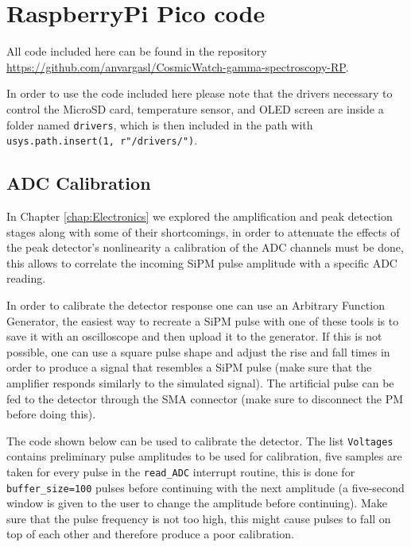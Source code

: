 \chapter{RaspberryPi Pico code}\label{app:RP_Pico_code}

All code included here can be found in the repository \\ \href{https://github.com/anvargasl/CosmicWatch-gamma-spectroscopy-RP}{https://github.com/anvargasl/CosmicWatch-gamma-spectroscopy-RP}.

In order to use the code included here please note that the drivers necessary to control the MicroSD card, temperature sensor, and OLED screen are inside a folder named \texttt{drivers}, which is then included in the path with \texttt{usys.path.insert(1, r"/drivers/")}.

\section{ADC Calibration}\label{app:calibration}

In Chapter \ref{chap:Electronics} we explored the amplification and peak detection stages along with some of their shortcomings, in order to attenuate the effects of the peak detector's nonlinearity a calibration of the ADC channels must be done, this allows to correlate the incoming SiPM pulse amplitude with a specific ADC reading.

In order to calibrate the detector response one can use an Arbitrary Function Generator, the easiest way to recreate a SiPM pulse with one of these tools is to save it with an oscilloscope and then upload it to the generator. If this is not possible, one can use a square pulse shape and adjust the rise and fall times in order to produce a signal that resembles a SiPM pulse (make sure that the amplifier responds similarly to the simulated signal). The artificial pulse can be fed to the detector through the SMA connector (make sure to disconnect the PM before doing this).

The code shown below can be used to calibrate the detector. The list \texttt{Voltages} contains preliminary pulse amplitudes to be used for calibration, five samples are taken for every pulse in the \texttt{read\_ADC} interrupt routine, this is done for \texttt{buffer\_size=100} pulses before continuing with the next amplitude (a five-second window is given to the user to change the amplitude before continuing). Make sure that the pulse frequency is not too high, this might cause pulses to fall on top of each other and therefore produce a poor calibration.

